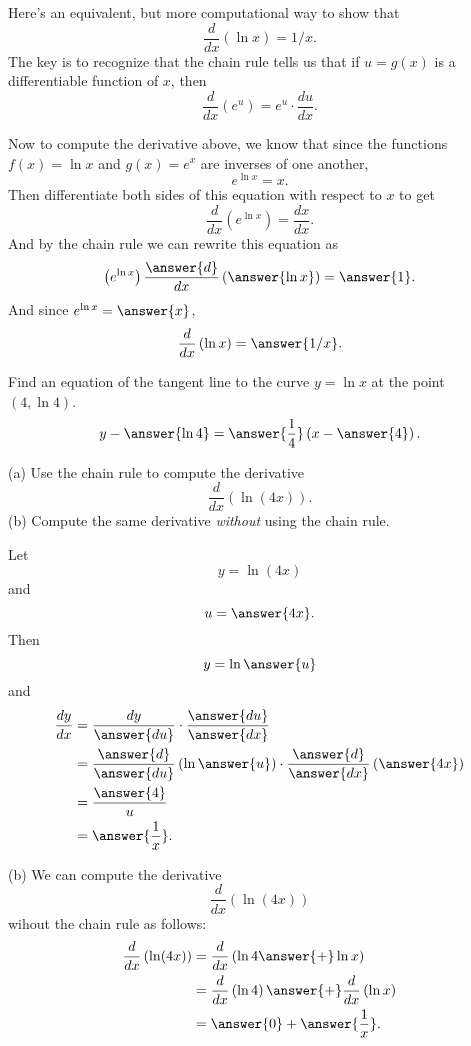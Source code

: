 \documentclass{ximera}
\begin{document}
\begin{question}  \label{Qddfs8888}
Here's an equivalent, but more computational way to show that
\[
  \frac{d}{dx} \left(  \ln x  \right) = 1/x.
\]
The key is to recognize that the chain rule tells us that if $u=g(x)$ is a differentiable function of $x$, then
\[
  \frac{d}{dx}\left( e^u  \right) = e^u \cdot \frac{du}{dx} .
\]

Now to compute the derivative above, we know that since the functions $f(x)=\ln x$ and $g(x)=e^x$ are inverses of one another,
\[
    e^{\ln x} = x .
\]
Then differentiate both sides of this equation with respect to $x$ to get
\[
        \frac{d}{dx} \left(  e^{\ln x} \right) = \frac{dx}{dx} .
\]
And by the chain rule we can rewrite this equation as
\[
         \left(  e^{\ln x} \right)   \frac{\answer{d}}{dx} \left(  \answer{\ln x} \right) = \answer{1} . 
\]
And since $e^{\ln x} = \answer{x}$, 
\[
         \frac{d}{dx} \left(  \ln x  \right) = \answer{1/x}.
\]
\end{question}


\begin{question}   \label{QDEgfdghb}
Find an equation of the tangent line to the curve $y=\ln x$ at the point $(4,\ln 4)$.
\[
     y - \answer{\ln 4} = \answer{\frac{1}{4}} \left( x - \answer{4}  \right).
\]
\end{question}

\begin{question} \label{Qdfvbtnnn}
(a) Use the chain rule to compute the derivative
\[
    \frac{d}{dx} \left(  \ln (4x) \right) .
\]
(b) Compute the same derivative \emph{without} using the chain rule.

\begin{explanation}
Let 
\[
    y  =\ln (4x)
\]
and
\[
       u = \answer{4x} .
\]
Then 
\[
    y  = \ln \answer{u}
\] 
and
\begin{align*}
   \frac{dy}{dx} & = \frac{dy}{\answer{du}} \cdot \frac{\answer{du}}{\answer{dx}} \\
                       & = \frac{\answer{d}}{\answer{du}} \left( \ln \answer{u}  \right) \cdot \frac{\answer{d}}{\answer{dx}}\left(  \answer{4x} \right)  \\
                        &= \frac{\answer{4}}{u} \\
                        &= \answer{\frac{1}{x}} .
 \end{align*}

(b) We can compute the derivative
\[
    \frac{d}{dx} \left(  \ln (4x) \right) 
\]
wihout the chain rule as follows:
\begin{align*}
    \frac{d}{dx} \left(  \ln (4x) \right)  &=  \frac{d}{dx} \left(  \ln 4 \answer{+} \ln x \right) \\
                                                       &=  \frac{d}{dx}\left( \ln 4  \right) \answer{+}   \frac{d}{dx}\left( \ln x  \right) \\
                                                      &=\answer{0} + \answer{\frac{1}{x}} .
\end{align*}
\end{explanation}
\end{question}
\end{document}
